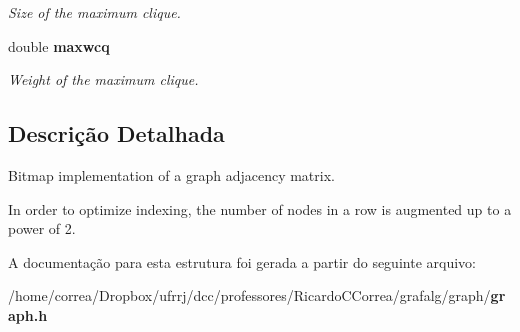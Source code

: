 \begin{DoxyCompactItemize}
\begin{DoxyCompactList}\small\item\em Size of the maximum clique. \end{DoxyCompactList}\item 
double {\bf maxwcq}\label{structGraph_a22821e1cd387ed0e72c6493be9dd4a3b}

\begin{DoxyCompactList}\small\item\em Weight of the maximum clique. \end{DoxyCompactList}\end{DoxyCompactItemize}


\subsection{Descrição Detalhada}
Bitmap implementation of a graph adjacency matrix. 

In order to optimize indexing, the number of nodes in a row is augmented up to a power of 2. 

A documentação para esta estrutura foi gerada a partir do seguinte arquivo\+:\begin{DoxyCompactItemize}
\item 
/home/correa/\+Dropbox/ufrrj/dcc/professores/\+Ricardo\+C\+Correa/grafalg/graph/{\bf graph.\+h}\end{DoxyCompactItemize}
